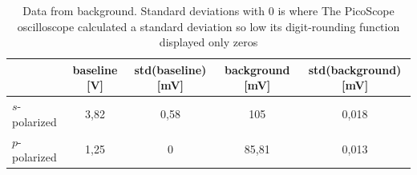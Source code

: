 \begin{landscape}
\begin{table}[!ht]
    \caption{Data from background.  Standard deviations with $0$ is where The PicoScope oscilloscope calculated a standard deviation so low its digit-rounding function displayed only zeros}
    \centering
    \begin{tabular}{lcccc}
        \hline\hline
        & baseline [\textup{V}] & std(baseline)[\textup{mV}] & background [\textup{mV}] & std(background) [\textup{mV}] \\
                        \hline
                        \rule{0pt}{1.1em}\noindent
        $s$-polarized & 3,82    & 0,58        & 105        & 0,018         \\
        $p$-polarized & 1,25    & 0             & 85,81      & 0,013        \\
                        \hline
    \end{tabular}
\end{table}

\end{landscape}
